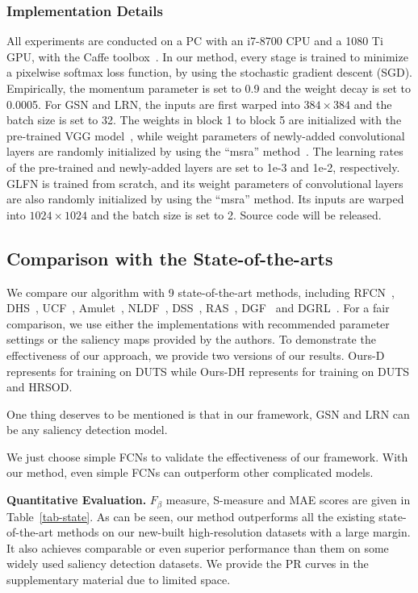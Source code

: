 \subsubsection{Implementation Details}

All experiments are conducted on a PC with an i7-8700 CPU and a 1080 Ti GPU, with the Caffe toolbox~\cite{jia2014caffe}. In our method, every stage is trained to minimize a pixelwise softmax loss function, by using the stochastic gradient descent (SGD). Empirically, the momentum parameter is set to 0.9 and the weight decay is set to 0.0005. For GSN and LRN, the inputs are first warped into $384\times384$ and the batch size is set to 32. The weights in block 1 to block 5 are initialized with the pre-trained VGG model~\cite{simonyan2014very}, while weight parameters of newly-added convolutional layers are randomly initialized by using the ``msra'' method~\cite{he2015delving}. The learning rates of the pre-trained and newly-added layers are set to 1e-3 and 1e-2, respectively. GLFN is trained from scratch, and its weight parameters of convolutional layers are also randomly initialized by using the ``msra'' method. Its inputs are warped into $1024\times1024$ and the batch size is set to 2. Source code will be released.

\subsection{Comparison with the State-of-the-arts} We compare our algorithm with 9 state-of-the-art methods, including RFCN~\cite{wang2016saliency}, DHS~\cite{liu2016dhsnet}, UCF~\cite{zhang2017learning}, Amulet~\cite{zhang2017amulet}, NLDF~\cite{luo2017non}, DSS~\cite{hou2017deeply}, RAS~\cite{chen2018reverse}, DGF~\cite{wu2018fast} and DGRL~\cite{wang2018detect}. For a fair comparison, we use either the implementations with recommended parameter settings or the saliency maps provided by the authors. To demonstrate the effectiveness of our approach, we provide two versions of our results. Ours-D represents for training on DUTS while Ours-DH represents for training on DUTS and HRSOD.

One thing deserves to be mentioned is that in our framework, GSN and LRN can be any saliency detection model.

We just choose simple FCNs to validate the effectiveness of our framework. With our method, even simple FCNs can outperform other complicated models.

\textbf{Quantitative Evaluation.}
$F_\beta$ measure, S-measure and MAE scores are given in Table~\ref{tab-state}. As can be seen, our method outperforms all the existing state-of-the-art methods on our new-built high-resolution datasets with a large margin. It also achieves comparable or even superior performance than them on some widely used saliency detection datasets. We provide the PR curves in the supplementary material due to limited space.

